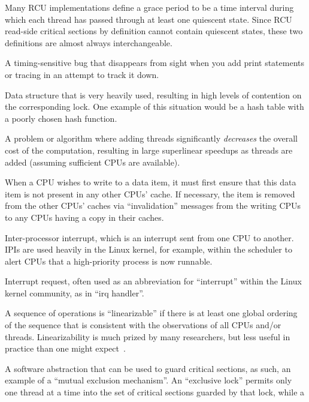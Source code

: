 \begin{description}
	Many RCU implementations define a grace period to be a
	time interval during which each thread has passed through at
	least one quiescent state.
	Since RCU read-side critical sections by definition cannot
	contain quiescent states, these two definitions are almost
	always interchangeable.
\item[Heisenbug:]
	A timing-sensitive bug that disappears from sight when you
	add print statements or tracing in an attempt to track it
	down.
\item[Hot Spot:]
	Data structure that is very heavily used, resulting in high
	levels of contention on the corresponding lock.
	One example of this situation would be a hash table with
	a poorly chosen hash function.
\item[Humiliatingly Parallel:]
	A problem or algorithm where adding threads significantly
	\emph{decreases} the overall cost of the computation, resulting in
	large superlinear speedups as threads are added (assuming sufficient
	CPUs are available).
\item[Invalidation:]
	When a CPU wishes to write to a data item, it must first ensure
	that this data item is not present in any other CPUs' cache.
	If necessary, the item is removed from the other CPUs' caches
	via ``invalidation'' messages from the writing CPUs to any
	CPUs having a copy in their caches.
\item[IPI:]
	Inter-processor interrupt, which is an
	interrupt sent from one CPU to another.
	IPIs are used heavily in the Linux kernel, for example, within
	the scheduler to alert CPUs that a high-priority process is now
	runnable.
\item[IRQ:]
	Interrupt request, often used as an abbreviation for ``interrupt''
	within the Linux kernel community, as in ``irq handler''.
\item[Linearizable:]
	A sequence of operations is ``linearizable'' if there is at
	least one global ordering of the sequence that is consistent
	with the observations of all CPUs and/or threads.
	Linearizability is much prized by many researchers, but less
	useful in practice than one might
	expect~\cite{AndreasHaas2012FIFOisnt}.
\item[Lock:]
	A software abstraction that can be used to guard critical sections,
	as such, an example of a ``mutual exclusion mechanism''.
	An ``exclusive lock'' permits only one thread at a time into the
	set of critical sections guarded by that lock, while a

\end{description}
